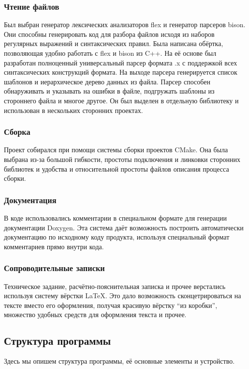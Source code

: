 \documentclass[a4paper,12pt]{report}
\numberwithin{equation}{section}
\begin{document}
\subsubsection{Чтение файлов}
Был выбран генератор лексических анализаторов flex и генератор парсеров bison. Они способны генерировать код для разбора файлов исходя из наборов регулярных выражений и синтаксических правил. Была написана обёртка, позволяющая удобно работать с flex и bison из C++. На её основе был разработан полноценный универсальный парсер формата .x с поддержкой всех синтаксических конструкций формата. На выходе парсера генерируется список шаблонов и иерархическое дерево данных из файла. Парсер способен обнаруживать и указывать на ошибки в файле, подгружать шаблоны из стороннего файла и многое другое. Он был выделен в отдельную библиотеку и использован в нескольких сторонних проектах.

\subsubsection{Сборка}
Проект собирался при помощи системы сборки проектов CMake. Она была выбрана из-за большой гибкости, простоты подключения и линковки сторонних библиотек и удобства и относительной простоты файлов описания процесса сборки.

\subsubsection{Документация}
В коде использовались комментарии в специальном формате для генерации документации Doxygen. Эта система даёт возможность построить автоматически документацию по исходному коду продукта, используя специальный формат комментариев прямо внутри кода.

\subsubsection{Сопроводительные записки}
Техническое задание, расчётно-пояснительная записка и прочее верстались используя систему вёрстки \LaTeX . Это дало возможность сконцетрироваться на тексте вместо его оформления, получая красивую вёрстку ``из коробки'', множество удобных средств для оформления текста и прочее.

\subsection{Структура программы}
Здесь мы опишем структура программы, её основные элементы и устройство.
\end{document}
